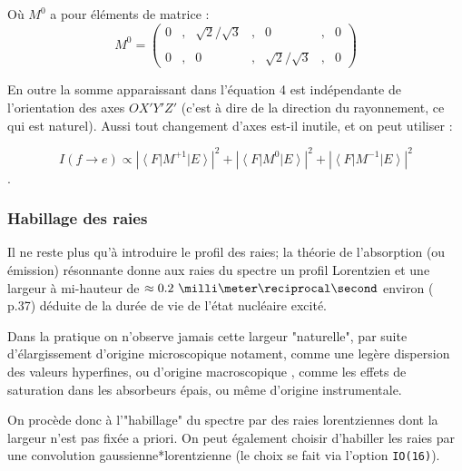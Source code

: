 Où $M^0$ a pour éléments de matrice : 
\begin{equation}
M^0=\left(\begin{array}{ccccccc}
  0&,&\sqrt{2}/\sqrt{3} &,&0&,& 0 \\
  \\
  0&,&0&,&\sqrt{2}/\sqrt{3} &,& 0
\end{array} \right)
\end{equation}

En outre la somme apparaissant dans l'équation 4 est indépendante de l'orientation des axes $OX'Y'Z'$ (c'est à dire de la direction du rayonnement, ce qui est naturel).
Aussi tout changement d'axes est-il inutile, et on peut utiliser :

\begin{equation}
I(f \rightarrow e) \propto \left| \left\langle F\right| M^{+1} \left|E\right\rangle \right|^2  
      + \left| \left\langle F\right| M^{0}  \left|E\right\rangle \right|^2
      + \left| \left\langle F\right| M^{-1} \left|E\right\rangle \right|^2
\end{equation}.
\subsubsection{Habillage des raies}
Il ne reste plus qu'à introduire le profil des raies; la théorie de l'absorption (ou émission) résonnante donne aux raies du spectre un profil Lorentzien et une largeur à mi-hauteur de $\approx0.2~\milli\meter\reciprocal\second$ environ (\cite{abragam-appli} p.37) déduite de la durée de vie de l'état nucléaire excité.

Dans la pratique on n'observe jamais cette largeur "naturelle", par suite d'élargissement d'origine microscopique notament, comme une legère dispersion des valeurs hyperfines,
 ou d'origine macroscopique , comme les effets de saturation dans les absorbeurs épais, ou même d'origine instrumentale.
 
 On procède donc à l'"habillage" du spectre par des raies lorentziennes dont la largeur n'est pas fixée a priori. On peut également choisir d'habiller les raies par une convolution gaussienne*lorentzienne (le choix se fait via l'option \lstinline{IO(16)}).

